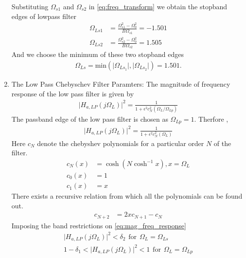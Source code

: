 \documentclass{article}
\begin{document}
\begin{enumerate}
		Substituting $\Omega_{s1}$ and $\Omega_{s2}$ in \eqref{eq:freq_transform} we obtain the stopband edges of lowpass filter 
		\begin{align}
			\Omega_{Ls1} &= \frac{\Omega_{s1}^2 - \Omega_0^2}{B\Omega_{s1}} = -1.501\\
			\Omega_{Ls2} &= \frac{\Omega_{s2}^2 - \Omega_0^2}{B\Omega_{s2}} = 1.505
		\end{align}
		And we choose the minimum of these two stopband edges
		\begin{align}
			\Omega_{Ls} = \mbox{min}(\vert \Omega_{Ls_1}\vert,\vert \Omega_{Ls_2}\vert) = 1.501.
		\end{align}
		\item {The Low Pass Chebyschev Filter Paramters:} The magnitude of frequency response of the low pass filter is given by 
		\begin{align}
			\vert H_{a,LP}(j\Omega_L)\vert^2 = \frac{1}{1 + \epsilon^2c_N^2(\Omega_L/\Omega_{Lp})} \label{eq:mag_freq_response}
		\end{align}
		The passband edge of the low pass filter is chosen as $\Omega_{Lp}=1$.
		Therfore ,
		\begin{align}
			\vert H_{a,LP}(j\Omega_L)\vert^2 = \frac{1}{1 + \epsilon^2c_N^2(\Omega_L)} \label{eq:specification}
		\end{align}
		Here $c_N$ denote the chebyshev polynomials for a particular order $N$ of the filter.
		\begin{align}
			c_N(x) &= \cosh(N \cosh^{-1}x) , x=\Omega_{L}\\
			c_0(x) &= 1 \\
			c_1(x) &= x
		\end{align}
		There exists a recursive relation from which all the polynomials can be found out.
		\begin{align}
			c_{N+2} &= 2xc_{N+1} - c_{N}  \label{eq:cheby_poly_relation}
		\end{align}
		Imposing the band restrictions on \eqref{eq:mag_freq_response} \\
		\begin{align}
			\vert H_{a,LP}(j\Omega_L)\vert^2 < \delta_{2} \hspace{5pt} \text{for}\hspace{5pt} \Omega_L = \Omega_{Ls}\\
			1-\delta_{1}<\vert H_{a,LP}(j\Omega_L)\vert^2 < 1 \hspace{5pt} \text{for}\hspace{5pt} \Omega_L = \Omega_{Lp}\\

\end{align}
\end{enumerate}
\end{document}
